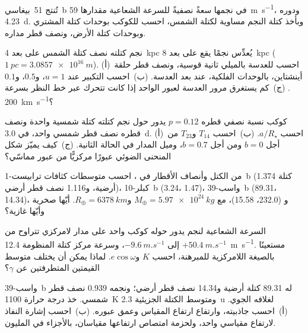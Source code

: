\begin{exercise}[$\star$]\label{exo:b3:exoplanets:3}
تُنتج 51~بيغاسي~b في نجمها سعةً نصفيةً للسرعة الشعاعية مقدارها
\qty{59}{m.s^{-1}}، ودوره \qty{4.23}{d}. وبأخذ كتلة النجم مساوية لكتلة الشمس،
احسب  للكوكب بوحدات كتلة المشتري
وبوحدات كتلة الأرض، ونصف قطر مداره.
\end{exercise}

\begin{exercise}[$\star$]\label{exo:b3:exoplanets:4}
نجم كتلته نصف كتلة الشمس على بعد \qty{4}{kpc} يُعدِّس نجمًا يقع على بعد
\qty{8}{kpc} ($\qty{1}{pc} = \qty{3.0857e16}{m}$). (أ)~احسب
 للعدسة بالميلي ثانية قوسية، ونصف قطر حلقة أينشتاين،
بالوحدات الفلكية، عند بعد العدسة. (ب)~احسب
التكبير عند $u = 1$، و$0.5$، و$0.1$. (ج)~كم يستغرق مرور العدسة
لعبور  الواحد إذا كانت تتحرك عبر خط النظر بسرعة
\qty{200}{km.s^{-1}}؟
\end{exercise}

\begin{exercise}[$\star\star$]\label{exo:b3:exoplanets:5}
كوكب نسبة نصفي قطره $p = 0.12$ يدور حول نجم كتلته كتلة شمسية واحدة
ونصف قطره نصف قطر شمسي واحد، في \qty{3.0}{d}. (أ)~احسب $a/R_\star$. (ب)~احسب
$T_{14}$ و$T_{23}$ من أجل $b = 0$ ومن أجل $b = 0.7$، وميل المدار
في الحالة الثانية. (ج)~كيف يميّز شكل المنحنى الضوئي عبورًا مركزيًّا من عبور
مماسّي؟
\end{exercise}

\begin{exercise}[$\star\star$]\label{exo:b3:exoplanets:6}
من الكتل وأنصاف الأقطار في ، احسب متوسطات
كثافات ترابيست-1~b (1.374 كتلة أرضية، و1.116 نصف قطر أرضي)،
كبلر-10~b (3.24، 1.47)، واسب-39~b (89.31، 14.34)، و (232.0،
15.58)، مع $M_\oplus = \qty{5.97e24}{kg}$ و$R_\oplus =
\qty{6378}{km}$. أيّها صخرية وأيّها غازية؟
\end{exercise}

\begin{exercise}[$\star\star$]\label{exo:b3:exoplanets:7}
السرعة الشعاعية لنجم يدور حوله كوكب واحد على مدار لامركزي
تتراوح من $+\qty{50.4}{m.s^{-1}}$ إلى $-\qty{9.6}{m.s^{-1}}$، وسرعة
مركز كتلة المنظومة \qty{12.4}{m.s^{-1}}. مستعينًا بالصيغة
اللامركزية للمبرهنة، احسب $K$ و$e\cos\omega$. لماذا يمكن أن يختلف
متوسط القيمتين المتطرفتين عن $\gamma$؟
\end{exercise}

\begin{exercise}[$\star\star$]\label{exo:b3:exoplanets:8}
واسب-39~b له 89.31 كتلة أرضية و14.34 نصف قطر أرضي؛ ونجمه 0.939
نصف قطر شمسي. خذ درجة حرارة \qty{1100}{K} ومتوسط الكتلة الجزيئية
\qty{2.3}{u} لغلافه الجوي. (أ)~احسب جاذبيته، وارتفاع
ارتفاع المقياس وعمق عبوره. (ب)~احسب إشارة النفاذ لارتفاع مقياسي واحد،
ولحزمة امتصاص ارتفاعها مقياسان، بالأجزاء
في المليون.
\end{exercise}

